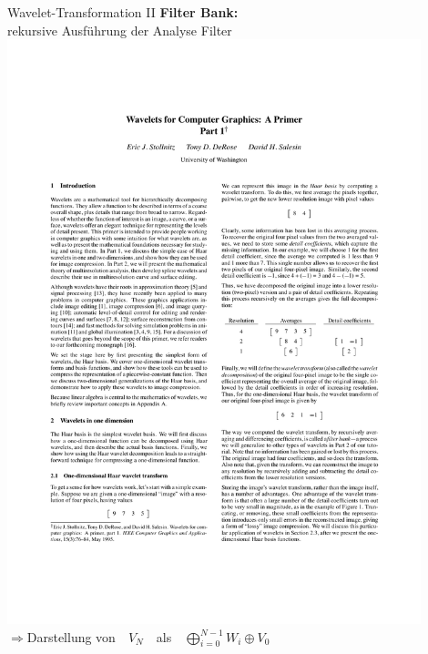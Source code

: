 	\begin{frame}{Wavelet-Transformation II}
		\alert{\bf Filter Bank:}\\rekursive Ausführung der Analyse Filter\vspace{6mm}\\
		{\centering\includegraphics[page=11, trim=60 695 305 100, clip, width=0.9\textwidth]{4_wavelet_final[14255].pdf}\vspace{16mm}}\\ \pause
		\large$\Rightarrow$\qquad Darstellung von\ \ $V_N$\ \ als\ \ $\bigoplus_{i=0}^{N-1}W_i\oplus V_0$
	\end{frame}

